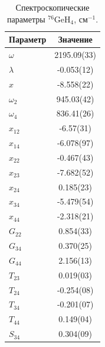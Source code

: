 \begin{table}[htbp]
\centering
\small
\caption{Спектроскопические параметры ${}^{76}$GeH$_4$, см$^{-1}$.}
\label{tab:ge_parameters_76}
\begin{tabular}{lc}
\toprule
Параметр & Значение \\
\midrule
$\omega$ & 2195.09(33) \\
$\lambda$ & -0.053(12) \\
$x$ & -8.558(22) \\
$\omega_2$ & 945.03(42) \\
$\omega_4$ & 836.41(26) \\
$x_{12}$ & -6.57(31) \\
$x_{14}$ & -6.078(97) \\
$x_{22}$ & -0.467(43) \\
$x_{23}$ & -7.682(52) \\
$x_{24}$ & 0.185(23) \\
$x_{34}$ & -5.479(54) \\
$x_{44}$ & -2.318(21) \\
$G_{22}$ & 0.854(33) \\
$G_{34}$ & 0.370(25) \\
$G_{44}$ & 2.156(13) \\
$T_{23}$ & 0.019(03) \\
$T_{24}$ & -0.254(08) \\
$T_{34}$ & -0.201(07) \\
$T_{44}$ & 0.149(04) \\
$S_{34}$ & 0.304(09) \\
\bottomrule
\end{tabular}
\end{table}
